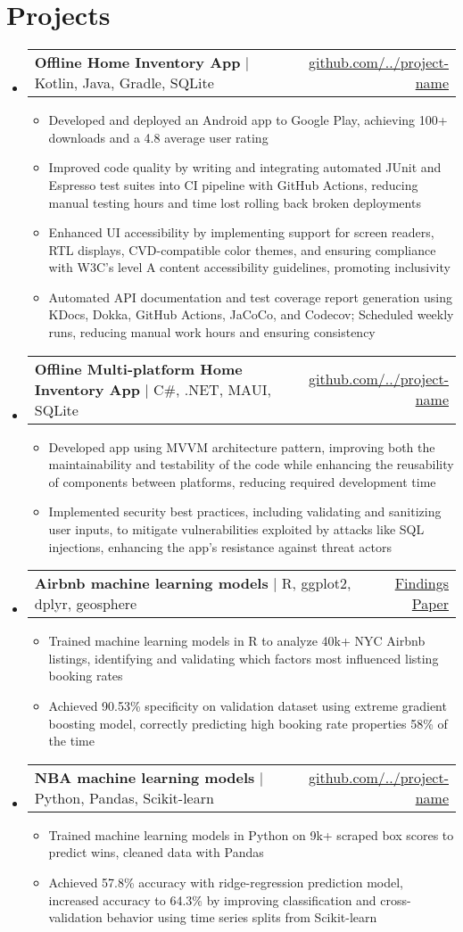 \documentclass[letterpaper,11pt]{article}
\makeatletter
\newcommand{\bulletpoint}[1]{
  \item\small{
    {#1 \vspace{-2pt}}
  }
}
\newcommand{\project}[4]{
    \item
    \begin{tabular*}{\textwidth}{l@{\extracolsep{\fill}}r}
        \small\textbf{#1} $|$ #2 & \href{#3}{#4} \\
    \end{tabular*}\vspace{-7pt}
}
\newcommand{\jobliststart}{\begin{itemize}[leftmargin=0.00in, label={}]}
\newcommand{\joblistend}{\end{itemize}}
\newcommand{\bulletpointListStart}{\begin{itemize}}
\newcommand{\bulletpointListEnd}{\end{itemize}\vspace{-5pt}}
\makeatother
\begin{document}
\section{Projects}
    \jobliststart
        \project
        {Offline Home Inventory App} 
        {Kotlin, Java, Gradle, SQLite}
        {https://github.com/name/project-name}
        {github.com/../project-name}
        \bulletpointListStart
            \bulletpoint{Developed and deployed an Android app to Google Play, achieving 100+ downloads and a 4.8 average user rating}
            \bulletpoint{Improved code quality by writing and integrating automated JUnit and Espresso test suites into CI pipeline with GitHub Actions, reducing manual testing hours and time lost rolling back broken deployments}
            \bulletpoint{Enhanced UI accessibility by implementing support for screen readers, RTL displays, CVD-compatible color themes, and ensuring compliance with W3C's level A content accessibility guidelines, promoting inclusivity} 
            \bulletpoint{Automated API documentation and test coverage report generation using KDocs, Dokka, GitHub Actions, JaCoCo, and Codecov; Scheduled weekly runs, reducing manual work hours and ensuring consistency} 
        \bulletpointListEnd
          
        \project
        {Offline Multi-platform Home Inventory App} 
        {C\#, .NET, MAUI, SQLite}
        {https://github.com/name/project-name}
        {github.com/../project-name}
        \bulletpointListStart
            \bulletpoint{Developed app using MVVM architecture pattern, improving both the maintainability and testability of the code while enhancing the reusability of components between platforms, reducing required development time}
            \bulletpoint{Implemented security best practices, including validating and sanitizing user inputs, to mitigate vulnerabilities exploited by attacks like SQL injections, enhancing the app's resistance against threat actors} 
        \bulletpointListEnd
          
        \project
        {Airbnb machine learning models}
        {R, ggplot2, dplyr, geosphere}{https://docs.google.com/document/d/1MGqQa2js63Aq8d81IvMLZk7Bu9_z6ZP6aDe3SeCATIc/edit?usp=sharing}
        {Findings Paper}
        \bulletpointListStart
            \bulletpoint{Trained machine learning models in R to analyze 40k+ NYC Airbnb listings, identifying and validating which factors most influenced listing booking rates} 
            \bulletpoint{Achieved 90.53\% specificity on validation dataset using extreme gradient boosting model, correctly predicting high booking rate properties 58\% of the time} 
        \bulletpointListEnd
    
        \project
        {NBA machine learning models}
        {Python, Pandas, Scikit-learn}        
        {https://github.com/name/project-name}
        {github.com/../project-name}
        \bulletpointListStart
            \bulletpoint{Trained machine learning models in Python on 9k+ scraped box scores to predict wins, cleaned data with Pandas}
            \bulletpoint{Achieved 57.8\% accuracy with ridge-regression prediction model, increased accuracy to 64.3\% by improving classification and cross-validation behavior using time series splits from Scikit-learn}
        \bulletpointListEnd
    \joblistend
\end{document}
